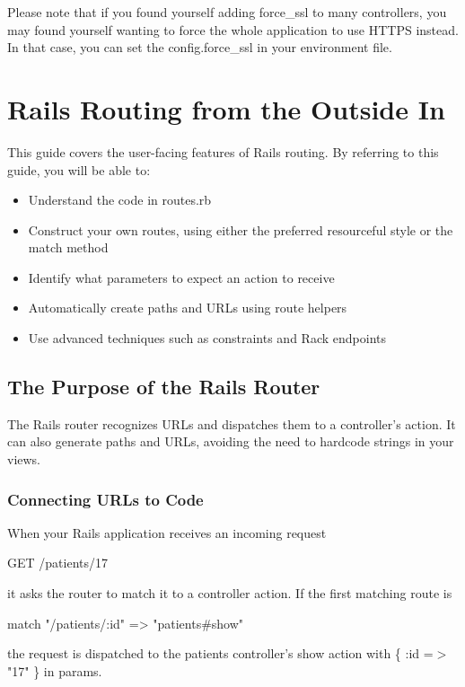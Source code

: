 \documentclass[10pt]{book}
\newenvironment{code}{%
  \scriptsize
    \verbatim
}{%
    \endverbatim
    \newline
}
\begin{document}
Please note that if you found yourself adding force\_ssl to many controllers, you may found yourself wanting to force the whole application to use HTTPS instead. In that case, you can set the config.force\_ssl in your environment file.

\chapter{Rails Routing from the Outside In}

This guide covers the user-facing features of Rails routing. By referring to this guide, you will be able to:
\begin{itemize}
	\item Understand the code in routes.rb
	\item Construct your own routes, using either the preferred resourceful style or the match method
	\item Identify what parameters to expect an action to receive
	\item Automatically create paths and URLs using route helpers
	\item Use advanced techniques such as constraints and Rack endpoints
\end{itemize}

\section{ The Purpose of the Rails Router}

The Rails router recognizes URLs and dispatches them to a  controller’s action. It can also generate paths and URLs, avoiding the  need to hardcode strings in your views.

\subsection{ Connecting URLs to Code}

When your Rails application receives an incoming request
\begin{code}
GET /patients/17
\end{code}

it asks the router to match it to a controller action. If the first matching route is
\begin{code}
match "/patients/:id" => "patients#show"
\end{code}

the request is dispatched to the patients controller’s show action with \{ :id =$>$ "17" \} in params.
\end{document}
